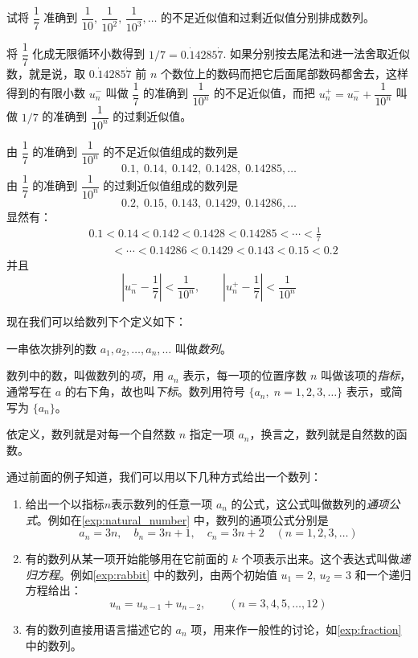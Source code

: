 \begin{example}\label{exp:fraction}
试将 $\dfrac{1}{7}$ 准确到 $\dfrac{1}{10},\,\dfrac{1}{10^2},\,\dfrac{1}{10^3},\ldots$ 的不足近似值和过剩近似值分别排成数列。
\end{example}

\begin{solution}
  {\linespread{1.60}\selectfont
  将 $\dfrac{1}{7}$ 化成无限循环小数得到 $1/7=0.\dot{1}4285\dot{7}$. 如果分别按去尾法和进一法舍取近似数，就是说，取 $0.\dot{1}4285\dot{7}$ 前 $n$ 个数位上的数码而把它后面尾部数码都舍去，这样得到的有限小数 $u_n^-$ 叫做 $\dfrac{1}{7}$ 的准确到 $\dfrac{1}{10^n}$ 的不足近似值，而把 $u_n^+=u_n^-+\dfrac{1}{10^n}$ 叫做 $1/7$ 的准确到 $\dfrac{1}{10^n}$ 的过剩近似值。\par\medskip}

由 $\dfrac{1}{7}$ 的准确到 $\dfrac{1}{10^n}$ 的不足近似值组成的数列是
\[0.1,\; 0.14,\; 0.142,\; 0.1428,\; 0.14285,\ldots\]
由 $\dfrac{1}{7}$ 的准确到 $\dfrac{1}{10^n}$ 的过剩近似值组成的数列是
\[0.2,\; 0.15,\; 0.143,\; 0.1429,\; 0.14286,\ldots\]
显然有：
\[\begin{split}
   & 0.1<0.14<0.142<0.1428<0.14285<\cdots<\frac{1}{7}\\
   &\qquad <\cdots<
0.14286<0.1429<0.143<0.15<0.2
\end{split}\]
并且
\[\left|u_n^--\frac{1}{7} \right|<\frac{1}{10^n},\qquad \left|u_n^+-\frac{1}{7} \right|<\frac{1}{10^n}\]
\end{solution}

现在我们可以给数列下个定义如下：
\begin{Definition}
一串依次排列的数 $a_1,a_2,\ldots,a_n,\ldots$ 叫做\emph{数列}。

数列中的数，叫做数列的\emph{项}，用 $a_n$ 表示，每一项的位置序数 $n$ 叫做该项的\emph{指标}，通常写在 $a$ 的右下角，故也叫\emph{下标}。数列用符号 $\{a_n,\; n=1,2,3,\ldots\}$ 表示，或简写为 $\{a_n\}$。
\end{Definition}

依定义，数列就是对每一个自然数 $n$ 指定一项 $a_n$，换言之，数列就是自然数的函数。

通过前面的例子知道，我们可以用以下几种方式给出一个数列：
\begin{enumerate}
\item 给出一个以指标$n$表示数列的任意一项 $a_n$ 的公式，这公式叫做数列的\emph{通项公式}。例如在\cref{exp:natural_number} 中，数列的通项公式分别是
\[a_n=3n,\quad b_n=3n+1,\quad c_n=3n+2 \quad (n=1,2,3,\ldots)\]
\item 有的数列从某一项开始能够用在它前面的 $k$ 个项表示出来。这个表达式叫做\emph{递归方程}。例如\cref{exp:rabbit} 中的数列，由两个初始值 $u_1=2$, $u_2=3$ 和一个递归方程给出：
\[u_n=u_{n-1}+u_{n-2},\qquad (n=3,4,5,\ldots,12)\]
\item 有的数列直接用语言描述它的 $a_n$ 项，用来作一般性的讨论，如\cref{exp:fraction} 中的数列。
\end{enumerate}


